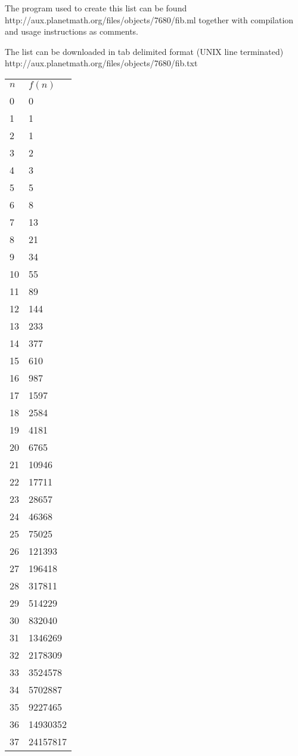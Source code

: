 \documentclass[12pt]{article}
\begin{document}
The  program used to create this list can be found 
{http://aux.planetmath.org/files/objects/7680/fib.ml} together with compilation and usage instructions as comments.

The list can be downloaded in tab delimited format (UNIX line terminated) 
{http://aux.planetmath.org/files/objects/7680/fib.txt}

\begin{tabular}{l|l}
$n$ & $f(n)$ \\
0 & 0 \\
1 & 1 \\
2 & 1 \\
3 & 2 \\
4 & 3 \\
5 & 5 \\
6 & 8 \\
7 & 13 \\
8 & 21 \\
9 & 34 \\
10 & 55 \\
11 & 89 \\
12 & 144 \\
13 & 233 \\
14 & 377 \\
15 & 610 \\
16 & 987 \\
17 & 1597 \\
18 & 2584 \\
19 & 4181 \\
20 & 6765 \\
21 & 10946 \\
22 & 17711 \\
23 & 28657 \\
24 & 46368 \\
25 & 75025 \\
26 & 121393 \\
27 & 196418 \\
28 & 317811 \\
29 & 514229 \\
30 & 832040 \\
31 & 1346269 \\
32 & 2178309 \\
33 & 3524578 \\
34 & 5702887 \\
35 & 9227465 \\
36 & 14930352 \\
37 & 24157817 \\

\end{tabular}
\end{document}
